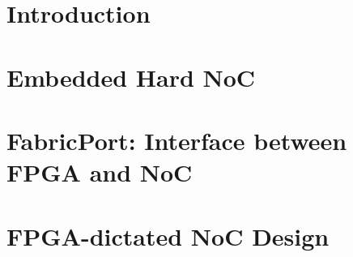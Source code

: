 \documentclass{sig-alternate}
\begin{document}


\maketitle


%
%
\begin{abstract}

\end{abstract}
%
%
%
%
%
\section{Introduction}
%

%
%
\section{Embedded Hard NoC}
\label{sec:hnoc}
%

%
%
\section{FabricPort: Interface between FPGA and NoC}
\label{sec_fabricport}
%

%
%
\section{FPGA-dictated NoC Design}
\label{sec_fpganoc}
%

%
%
%
%
%
%
\end{document}
